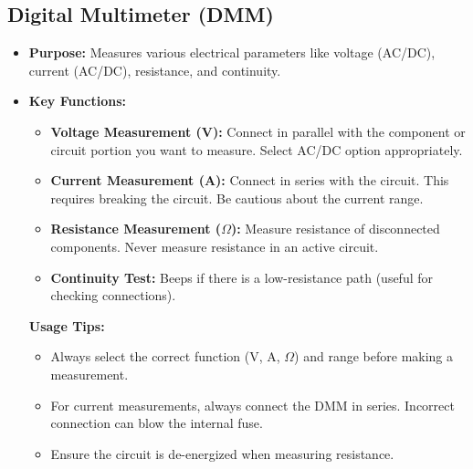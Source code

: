 \subsection*{Digital Multimeter (DMM)}
\begin{itemize}
	\item\textbf{ Purpose:} Measures various electrical parameters like voltage (AC/DC), current
	(AC/DC), resistance, and continuity.
	\item \textbf{Key Functions:}
	\begin{itemize}
		\item 	\textbf{Voltage Measurement (V):} Connect in parallel with the component or circuit
		portion you want to measure. Select AC/DC option appropriately.
		\item \textbf{Current Measurement (A):} Connect in series with the circuit. This requires
		breaking the circuit. Be cautious about the current range.
		\item \textbf{Resistance Measurement ($\Omega$):} Measure resistance of disconnected
		components. Never measure resistance in an active circuit.
		\item \textbf{Continuity Test:} Beeps if there is a low-resistance path (useful for checking
		connections).
	\end{itemize}

	\textbf{Usage Tips:}
	\begin{itemize}
		\item Always select the correct function (V, A, $\Omega$) and range before making a
		measurement.
		\item For current measurements, always connect the DMM in series. Incorrect
		connection can blow the internal fuse.
		\item Ensure the circuit is de-energized when measuring resistance.
	\end{itemize}
	
\end{itemize}

